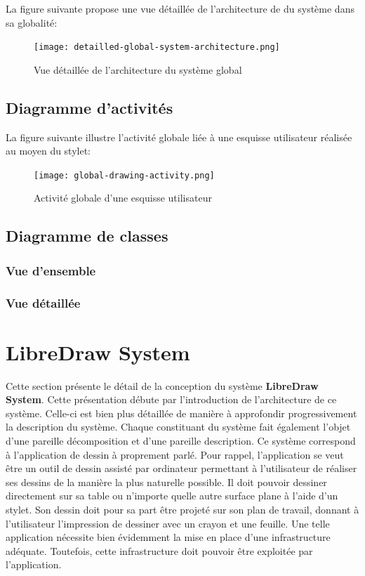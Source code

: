 \documentclass[11pt,a4paper,oldfontcommands]{memoir}
\begin{document}
La figure suivante propose une vue détaillée de l'architecture de du système dans sa globalité:

\begin{figure}[H]
\centering
\texttt{[image: detailled-global-system-architecture.png]}
\caption{Vue détaillée de l'architecture du système global}
\end{figure}

\newpage

\subsection{Diagramme d'activités}

La figure suivante illustre l'activité globale liée à une esquisse utilisateur réalisée au moyen du stylet:

\begin{figure}[H]
\centering
\texttt{[image: global-drawing-activity.png]}
\caption{Activité globale d'une esquisse utilisateur}
\end{figure}

\subsection{Diagramme de classes}

\subsubsection{Vue d'ensemble}

\subsubsection{Vue détaillée}

\newpage

\section{LibreDraw System}

Cette section présente le détail de la conception du système \textbf{LibreDraw System}. Cette présentation débute par l'introduction de l'architecture de ce système. Celle-ci est bien plus détaillée de manière à approfondir progressivement la description du système. Chaque constituant du système fait également l'objet d'une pareille décomposition et d'une pareille description. Ce système correspond à l'application de dessin à proprement parlé. Pour rappel, l'application se veut être un outil de dessin assisté par ordinateur permettant à l'utilisateur de réaliser ses dessins de la manière la plus naturelle possible. Il doit pouvoir dessiner directement sur sa table ou n'importe quelle autre surface plane à l'aide d'un stylet. Son dessin doit pour sa part être projeté sur son plan de travail, donnant à l'utilisateur l'impression de dessiner avec un crayon et une feuille. Une telle application nécessite bien évidemment la mise en place d'une infrastructure adéquate. Toutefois, cette infrastructure doit pouvoir être exploitée par l'application. 
\end{document}
